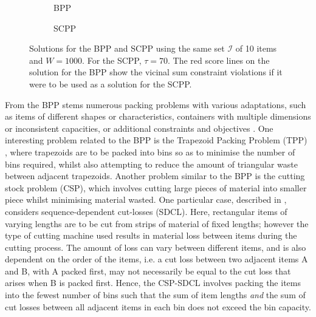 \documentclass[a4paper,11pt,authoryear]{elsarticle}
\begin{document}
\begin{figure}[H]
	\centering	
	\begin{subfigure}[h]{0.42\textwidth}
		
		\caption{BPP}
		\label{fig:bpp}
	\end{subfigure} \hspace{10mm}
	\begin{subfigure}[h]{0.42\textwidth}
		
		\caption{SCPP}
		\label{fig:scpp}
	\end{subfigure}
	\caption{Solutions for the BPP and SCPP using the same set $\mathcal{I}$ of 10 items and $W = 1000$. For the SCPP, $\tau = 70$. The red score lines on the solution for the BPP show the vicinal sum constraint violations if it were to be used as a solution for the SCPP.}	
	\label{fig:bppvscpp}
\end{figure}

\noindent From the BPP stems numerous packing problems with various adaptations, such as items of different shapes or characteristics, containers with multiple dimensions or inconsistent capacities, or additional constraints and objectives \cite{haouari2009, kenmochi2009, xavier2008}. One interesting problem related to the BPP is the Trapezoid Packing Problem (TPP) \cite{lewis2011, lewis2017}, where trapezoids are to be packed into bins so as to minimise the number of bins required, whilst also attempting to reduce the amount of triangular waste between adjacent trapezoids. Another problem similar to the BPP is the cutting stock problem (CSP), which involves cutting large pieces of material into smaller piece whilst minimising material wasted. One particular case, described in \cite{garraffa2016}, considers sequence-dependent cut-losses (SDCL). Here, rectangular items of varying lengths are to be cut from strips of material of fixed lengths; however the type of cutting machine used results in material loss between items during the cutting process. The amount of loss can vary between different items, and is also dependent on the order of the items, i.e. a cut loss between two adjacent items A and B, with A packed first, may not necessarily be equal to the cut loss that arises when B is packed first. Hence, the CSP-SDCL involves packing the items into the fewest number of bins such that the sum of item lengths \emph{and} the sum of cut losses between all adjacent items in each bin does not exceed the bin capacity.
\end{document}
